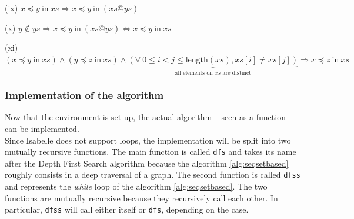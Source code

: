 \documentclass[a4 paper, 12pt]{article}
\theoremstyle{definition}
\begin{document}
\begin{flushleft}
    (ix)
    $x \preceq y~\text{in}~xs \Longrightarrow x \preceq y~\text{in}~(xs @ ys)$
\end{flushleft}

\begin{flushleft}
    (x)
    $y \notin ys \Longrightarrow x \preceq y~\text{in}~(xs @ ys) \Longleftrightarrow x \preceq y~\text{in}~xs$
\end{flushleft}

\begin{flushleft}
    (xi)
    $(x \preceq y~\text{in}~xs) \wedge (y \preceq z~\text{in}~xs) \wedge \underset{\text{all elements on $xs$ are distinct}}{\underbrace{(\forall~0 \leq i < j \leq \text{length}(xs), xs[i] \neq xs[j])}} \Longrightarrow x \preceq z~\text{in}~xs$
\end{flushleft}


\subsubsection{Implementation of the algorithm}

Now that the environment is set up, the actual algorithm -- seen as a function -- can be implemented.\\
Since Isabelle does not support loops, the implementation will be split into two mutually recursive functions. The main function is called \texttt{dfs} and takes its name after the Depth First Search algorithm because the algorithm \ref{alg:seqsetbased} roughly consists in a deep traversal of a graph. The second function is called \texttt{dfss} and represents the \textit{while} loop of the algorithm \ref{alg:seqsetbased}. The two functions are mutually recursive because they recursively call each other. In particular, \texttt{dfss} will call either itself or \texttt{dfs}, depending on the case.
\end{document}
